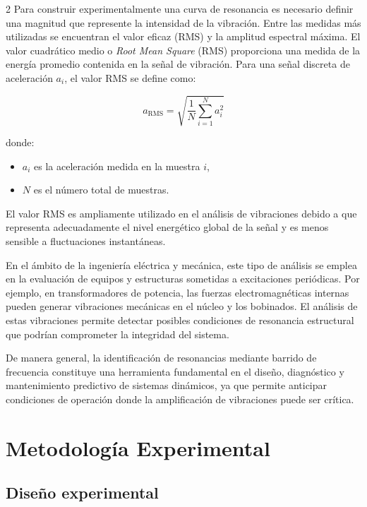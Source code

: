 \documentclass[10pt]{article}
\begin{document}
\begin{multicols}{2}
Para construir experimentalmente una curva de resonancia es necesario definir una magnitud que represente la intensidad de la vibración. Entre las medidas más utilizadas se encuentran el valor eficaz (RMS) y la amplitud espectral máxima.
El valor cuadrático medio o \textit{Root Mean Square} (RMS) proporciona una medida de la energía promedio contenida en la señal de vibración. Para una señal discreta de aceleración $a_i$, el valor RMS se define como:

\begin{equation}
a_{\mathrm{RMS}} = \sqrt{\frac{1}{N}\sum_{i=1}^{N} a_i^2}
\label{RMS}
\end{equation}

donde:
\begin{itemize}
    \item $a_i$ es la aceleración medida en la muestra $i$,
    \item $N$ es el número total de muestras.
\end{itemize}

El valor RMS es ampliamente utilizado en el análisis de vibraciones debido a que representa adecuadamente el nivel energético global de la señal y es menos sensible a fluctuaciones instantáneas.

En el ámbito de la ingeniería eléctrica y mecánica, este tipo de análisis se emplea en la evaluación de equipos y estructuras sometidas a excitaciones periódicas. Por ejemplo, en transformadores de potencia, las fuerzas electromagnéticas internas pueden generar vibraciones mecánicas en el núcleo y los bobinados. El análisis de estas vibraciones permite detectar posibles condiciones de resonancia estructural que podrían comprometer la integridad del sistema.

De manera general, la identificación de resonancias mediante barrido de frecuencia constituye una herramienta fundamental en el diseño, diagnóstico y mantenimiento predictivo de sistemas dinámicos, ya que permite anticipar condiciones de operación donde la amplificación de vibraciones puede ser crítica.




\section{Metodología Experimental}

\subsection{Diseño experimental}


\end{multicols}
\end{document}
